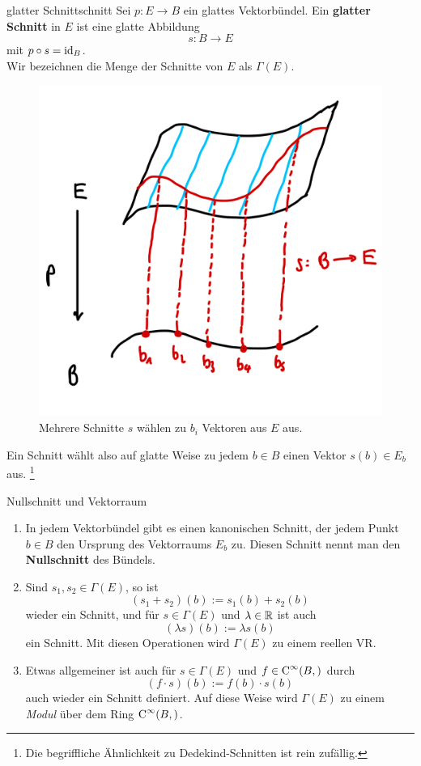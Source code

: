 \begin{definition}{glatter Schnitt}{schnitt}
Sei $p: E \to B$ ein glattes Vektorbündel. Ein \textbf{glatter Schnitt} in $E$ ist eine glatte Abbildung 
\begin{equation}
s: B \to E
\end{equation}
mit $p \circ s = \text{id}_B$.\\
Wir bezeichnen die Menge der Schnitte von $E$ als $\Gamma(E)$.
\begin{figure}[H]
\label{fig:schnitt}
\centering
\includegraphics[width=0.3\linewidth]{Bilder/schnitt.png}
\caption{Mehrere Schnitte $s$ wählen zu $b_i$ Vektoren aus $E$ aus.}
\end{figure}
\end{definition}
Ein Schnitt wählt also auf glatte Weise zu jedem $b \in B$ einen Vektor $s(b) \in E_b$ aus. \footnote{Die begriffliche Ähnlichkeit zu Dedekind-Schnitten ist rein zufällig.}
\begin{bemerkungen}Nullschnitt und Vektorraum\\
\begin{enumerate}
\item In jedem Vektorbündel gibt es einen kanonischen Schnitt, der jedem Punkt $b \in B$ den Ursprung des Vektorraums $E_b$ zu. Diesen Schnitt nennt man den \textbf{Nullschnitt} des Bündels.
\item Sind $s_1, s_2 \in \Gamma (E)$, so ist 
\begin{equation}
(s_1+s_2)(b):=s_1(b)+s_2(b)
\end{equation}
wieder ein Schnitt, und für $s \in \Gamma (E)$ und $\lambda \in \mathbb{R}$ ist auch 
\begin{equation}
(\lambda s)(b) := \lambda s(b)
\end{equation}
ein Schnitt. Mit diesen Operationen wird $\Gamma(E)$ zu einem reellen VR.
\item Etwas allgemeiner ist auch für $s \in \Gamma (E)$ und $f \in \cinf{B}{}$ durch
\begin{equation}
(f \cdot s)(b) := f(b) \cdot s(b)
\end{equation}
auch wieder ein Schnitt definiert. Auf diese Weise wird $\Gamma (E)$ zu einem \textit{Modul} über dem Ring $\cinf{B}{}$.
\end{enumerate}
\end{bemerkungen}

